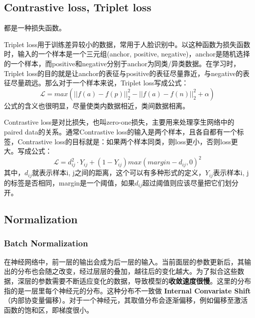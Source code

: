 \subsection{Contrastive loss, Triplet loss} 
都是一种损失函数。

Triplet loss用于训练差异较小的数据，常用于人脸识别中。以这种函数为损失函数时，输入的一个样本是一个三元组(anchor, positive, negative)，anchor是随机选择的一个样本，而positive和negative分别于anchor为同类/异类数据。在学习时，Triplet loss的目的就是让anchor的表征与positive的表征尽量靠近，与negative的表征尽量疏远。那么对于一个样本来说，Triplet loss写成公式： 
$$
\mathcal{L} = max( ||f(a)-f(p)||_2^2 - ||f(a) - f(n)||_2^2 + \alpha )
$$
公式的含义也很明显，尽量使类内数据相近，类间数据相离。

Contrastive loss是对比损失，也叫zero-one损失，主要用来处理孪生网络中的paired data的关系。通常Contrastive loss的输入是两个样本，且各自都有一个标签，Contrastive loss的目标就是：如果两个样本同类，则loss更小，否则loss更大。写成公式：
$$
\mathcal{L} = d_{ij}^2 \cdot Y_{ij} + (1 - Y_{ij} )max(margin - d_{ij}, 0)^2
$$
其中，$d_{ij}$就表示样本i, j之间的距离，这个可以有多种形式的定义，$Y_{ij}$表示样本i, j的标签是否相同，margin是一个阈值，如果$d_{ij}$超过阈值则应该尽量把它们划分开。

\subsection{Normalization}
\subsubsection{Batch Normalization}
在神经网络中，前一层的输出会成为后一层的输入。当前面层的参数更新后，其输出的分布也会随之改变，经过层层的叠加，越往后的变化越大。为了拟合这些数据，深层的参数需要不断适应变化的数据，导致模型的\textbf{收敛速度很慢}。这里的分布指的是一层里每个神经元的分布。这种分布不一致做 \textbf{Internal Convariate Shift}（内部协变量偏移）。对于一个神经元，其取值分布会逐渐偏移，例如偏移至激活函数的饱和区，即梯度很小。


